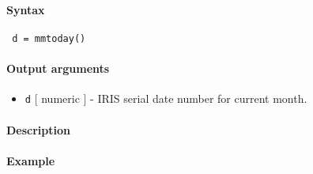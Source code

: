 


	\paragraph{Syntax}
 
 \begin{verbatim}
 d = mmtoday()
 \end{verbatim}
 
 \paragraph{Output arguments}
 
 \begin{itemize}
 \item
   \texttt{d} {[} numeric {]} - IRIS serial date number for current
   month.
 \end{itemize}
 
 \paragraph{Description}
 
 \paragraph{Example}


